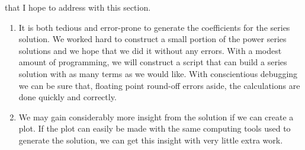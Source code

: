  that I hope to address with this section.  
\begin{enumerate}
\item It is both tedious and error-prone to generate the coefficients for the series solution.  We worked hard to construct a small portion of the power series solutions and we hope that we did it without any errors.  With a modest amount of programming, we will construct a script that can build a series solution with as many terms as we would like.  With conscientious debugging we can be sure that, floating point round-off errors aside, the calculations are done quickly and correctly.  

\item We may gain considerably more insight from the solution if we can create a plot.  If the plot can easily be made with the same computing tools used to generate the solution, we can get this insight with very little extra work.
\end{enumerate}

